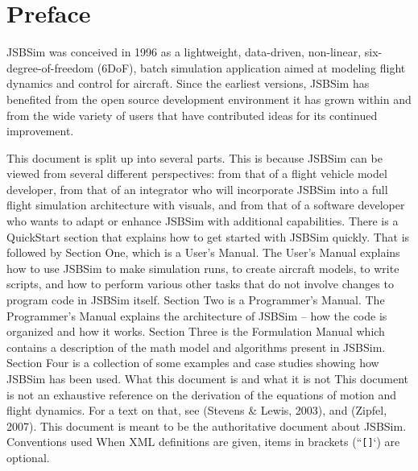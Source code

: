 %
%
%
%
%
\chapter{Preface}

JSBSim was conceived in 1996 as a lightweight, data-driven, non-linear, six-degree-of-freedom (6DoF), batch simulation application aimed at modeling flight dynamics and control for aircraft. Since the earliest versions, JSBSim has benefited from the open source development environment it has grown within and from the wide variety of users that have contributed ideas for its continued improvement.

This document is split up into several parts. This is because JSBSim can be viewed from several different perspectives: from that of a flight vehicle model developer, from that of an integrator who will incorporate JSBSim into a full flight simulation architecture with visuals, and from that of a software developer who wants to adapt or enhance JSBSim with additional capabilities.
There is a QuickStart section that explains how to get started with JSBSim quickly. That is followed by Section One, which is a User’s Manual. The User’s Manual explains how to use JSBSim to make simulation runs, to create aircraft models, to write scripts, and how to perform various other tasks that do not involve changes to program code in JSBSim itself. Section Two is a Programmer’s Manual. The Programmer’s Manual explains the architecture of JSBSim – how the code is organized and how it works. Section Three is the Formulation Manual which contains a description of the math model and algorithms present in JSBSim. Section Four is a collection of some examples and case studies showing how JSBSim has been used.
What this document is and what it is not
This document is not an exhaustive reference on the derivation of the equations of motion and flight dynamics. For a text on that, see (Stevens \& Lewis, 2003), and (Zipfel, 2007). This document is meant to be the authoritative document about JSBSim.
Conventions used
When XML definitions are given, items in brackets (``\texttt{[]}`) are optional.


